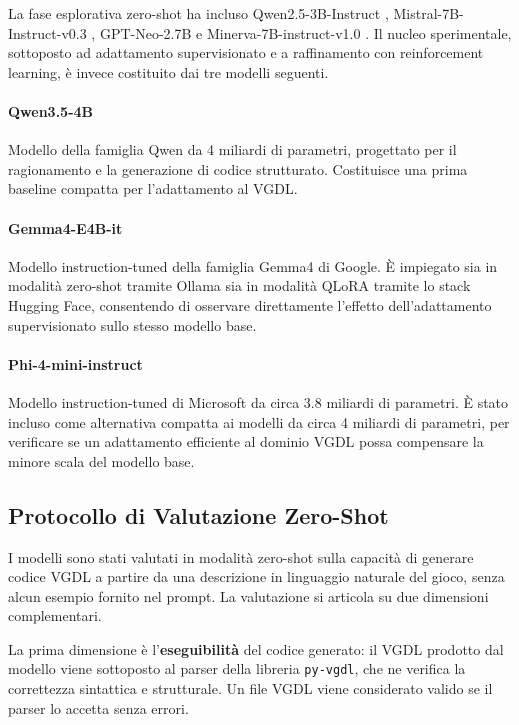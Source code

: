 \documentclass[final,5p,times,twocolumn]{elsarticle}
\begin{document}
La fase esplorativa zero-shot ha incluso Qwen2.5-3B-Instruct \citep{qwen2.5}, Mistral-7B-Instruct-v0.3 \citep{jiang2023mistral7b}, GPT-Neo-2.7B \citep{gpt-neo} e Minerva-7B-instruct-v1.0 \citep{orlando2024minerva}. Il nucleo sperimentale, sottoposto ad adattamento supervisionato e a raffinamento con reinforcement learning, è invece costituito dai tre modelli seguenti.

\paragraph{Qwen3.5-4B} \citep{qwen3.5} Modello della famiglia Qwen da 4 miliardi di parametri, progettato per il ragionamento e la generazione di codice strutturato. Costituisce una prima baseline compatta per l'adattamento al VGDL.

\paragraph{Gemma4-E4B-it} \citep{gemma4} Modello instruction-tuned della famiglia Gemma4 di Google. È impiegato sia in modalità zero-shot tramite Ollama sia in modalità QLoRA tramite lo stack Hugging Face, consentendo di osservare direttamente l'effetto dell'adattamento supervisionato sullo stesso modello base.

\paragraph{Phi-4-mini-instruct} \citep{phi4mini} Modello instruction-tuned di Microsoft da circa 3.8 miliardi di parametri. È stato incluso come alternativa compatta ai modelli da circa 4 miliardi di parametri, per verificare se un adattamento efficiente al dominio VGDL possa compensare la minore scala del modello base.

\subsection{Protocollo di Valutazione Zero-Shot}
\label{sec:zero-shot-protocol}

I modelli sono stati valutati in modalità zero-shot sulla capacità di generare codice VGDL a partire da una descrizione in linguaggio naturale del gioco, senza alcun esempio fornito nel prompt. La valutazione si articola su due dimensioni complementari.

La prima dimensione è l'\textbf{eseguibilità} del codice generato: il VGDL prodotto dal modello viene sottoposto al parser della libreria \texttt{py-vgdl}, che ne verifica la correttezza sintattica e strutturale. Un file VGDL viene considerato valido se il parser lo accetta senza errori.
\end{document}
